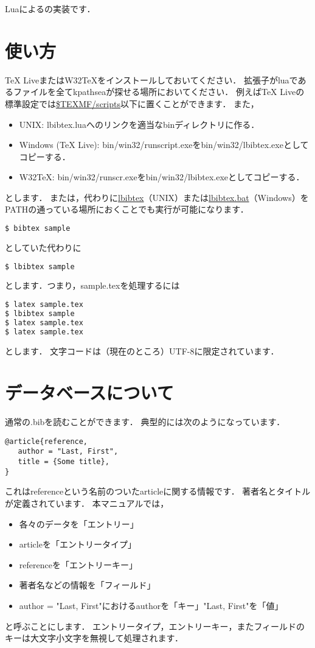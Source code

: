 \documentclass[a4paper]{ltjsarticle}
\title{\LBibTeX}
\date{}
\begin{document}
\maketitle
Luaによる\BibTeX の実装です．

\section{使い方}
TeX LiveまたはW32TeXをインストールしておいてください．
拡張子がluaであるファイルを全てkpathseaが探せる場所においてください．
例えばTeX Liveの標準設定では\url{$TEXMF/scripts}以下に置くことができます．%
また，
\begin{itemize}
\item UNIX: lbibtex.luaへのリンクを適当なbinディレクトリに作る．
\item Windows (TeX Live): bin/win32/runscript.exeをbin/win32/lbibtex.exeとしてコピーする．
\item W32TeX: bin/win32/runscr.exeをbin/win32/lbibtex.exeとしてコピーする．
\end{itemize}
とします．
または，代わりに\url{lbibtex}（UNIX）または\url{lbibtex.bat}（Windows）をPATHの通っている場所におくことでも実行が可能になります．

\begin{lstlisting}[language=bash]
$ bibtex sample
\end{lstlisting}
としていた代わりに
\begin{lstlisting}[language=bash]
$ lbibtex sample
\end{lstlisting}
とします．つまり，sample.texを処理するには
\begin{lstlisting}[language=bash]
$ latex sample.tex
$ lbibtex sample
$ latex sample.tex
$ latex sample.tex
\end{lstlisting}
とします．
文字コードは（現在のところ）UTF-8に限定されています．



\section{データベースについて}
通常の.bibを読むことができます．
典型的には次のようになっています．
\begin{verbatim}
@article{reference,
   author = "Last, First",
   title = {Some title},
}
\end{verbatim}
これはreferenceという名前のついたarticleに関する情報です．
著者名とタイトルが定義されています．
本マニュアルでは，
\begin{itemize}
\item 各々のデータを「エントリー」
\item articleを「エントリータイプ」
\item referenceを「エントリーキー」
\item 著者名などの情報を「フィールド」
\item author = "Last, First"におけるauthorを「キー」"Last, First"を「値」
\end{itemize}
と呼ぶことにします．
エントリータイプ，エントリーキー，またフィールドのキーは大文字小文字を無視して処理されます．
\end{document}
